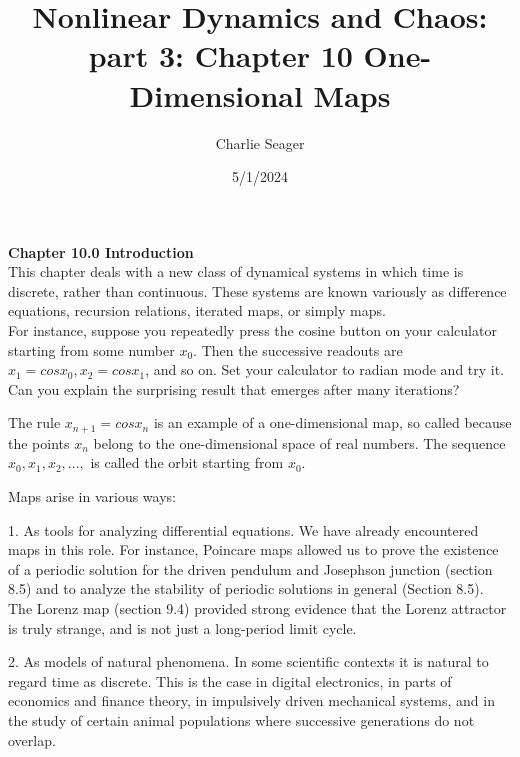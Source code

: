 \documentclass{article}
\newcommand\tab[1][1cm]{\hspace*{#1}}
\begin{document}
\title {Nonlinear Dynamics and Chaos: part 3: Chapter 10 One-Dimensional Maps}

\author{Charlie Seager}

\date{5/1/2024}
\maketitle



\textbf {Chapter 10.0 Introduction} \\
This chapter deals with a new class of dynamical systems in which time is discrete, rather than continuous. These systems are known variously as difference equations, recursion relations, iterated maps, or simply maps. \\ \tab
For instance, suppose you repeatedly press the cosine button on your calculator starting from some number $x_{0}$. Then the successive readouts are $x_{1}=cosx_{0}, x_{2}=cosx_{1}$, and so on. Set your calculator to radian mode and try it. Can you explain the surprising result that emerges after many iterations? \\ \tab

The rule $x_{n+1}=cosx_{n}$ is an example of a one-dimensional map, so called because the points $x_{n}$ belong to the one-dimensional space of real numbers. The sequence $x_{0},x_{1},x_{2},...,$ is called the orbit starting from $x_{0}$. \\ \tab

Maps arise in various ways: \\ \tab \tab

1. As tools for analyzing differential equations. We have already encountered maps in this role. For instance, Poincare maps allowed us to prove the existence of a periodic solution for the driven pendulum and Josephson junction (section 8.5) and to analyze the stability of periodic solutions in general (Section 8.5). The Lorenz map (section 9.4) provided strong evidence that the Lorenz attractor is truly strange, and is not just a long-period limit cycle. \\ \tab \tab

2. As models of natural phenomena. In some scientific contexts it is natural to regard time as discrete. This is the case in digital electronics, in parts of economics and finance theory, in impulsively driven mechanical systems, and in the study of certain animal populations where successive generations do not overlap. \\ \tab \tab
\end{document}
